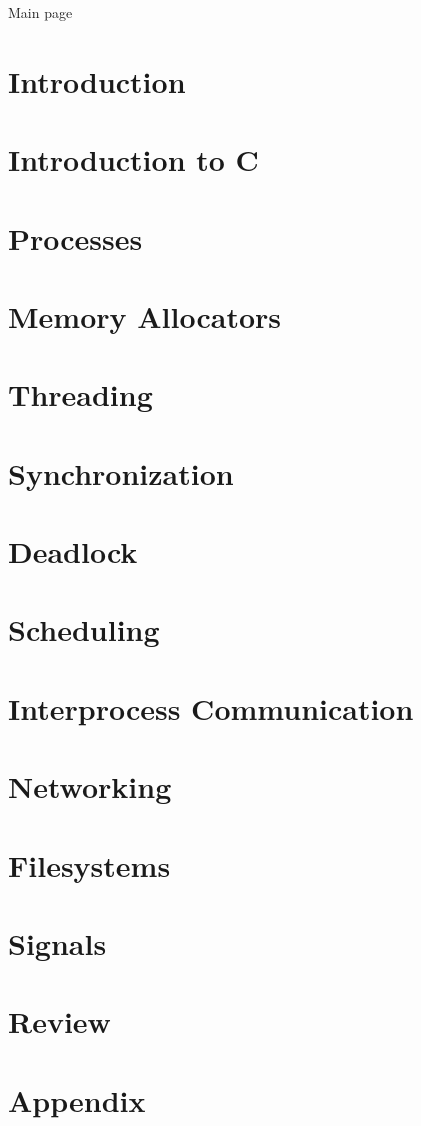\documentclass{article}
\newcommand{\inputchapter}[2]{\section{#2}\newpage}
\begin{document}
\pagestyle{fancy}
\fancyhf{}

Main page

\inputchapter{introduction/introduction.tex}{Introduction}
\inputchapter{introc/introc.tex}{Introduction to C}
\inputchapter{processes/processes.tex}{Processes}
\inputchapter{malloc/malloc.tex}{Memory Allocators}
\inputchapter{threads/threads.tex}{Threading}
\inputchapter{synchronization/synchronization.tex}{Synchronization}
\inputchapter{deadlock/deadlock.tex}{Deadlock}
\inputchapter{scheduling/scheduling.tex}{Scheduling}
\inputchapter{ipc/ipc.tex}{Interprocess Communication}
\inputchapter{networking/networking.tex}{Networking}
\inputchapter{filesystems/filesystems.tex}{Filesystems}
\inputchapter{signals/signals.tex}{Signals}
\inputchapter{review/review.tex}{Review}
\inputchapter{appendix/appendix.tex}{Appendix}
\end{document}
